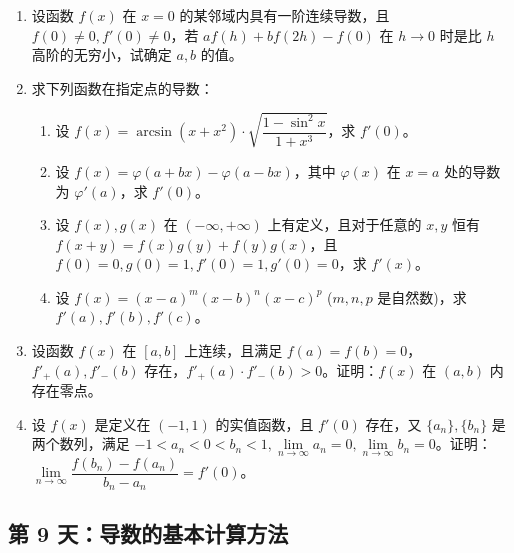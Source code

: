 \begin{enumerate}[label=\textbf{\arabic*.}, itemsep=4.7cm]
    \item 设函数 $f(x)$ 在 $x=0$ 的某邻域内具有一阶连续导数，且 $f(0) \neq 0, f'(0) \neq 0$，若 $a f(h) + b f(2h) - f(0)$ 在 $h \to 0$ 时是比 $h$ 高阶的无穷小，试确定 $a, b$ 的值。

    \item 求下列函数在指定点的导数：
    \begin{enumerate}[label=(\arabic*),itemsep=3cm]
        \item 设 $f(x) = \arcsin(x + x^2) \cdot \sqrt{\dfrac{1 - \sin^2 x}{1 + x^3}}$，求 $f'(0)$。
        \item 设 $f(x) = \varphi(a + bx) - \varphi(a - bx)$，其中 $\varphi(x)$ 在 $x=a$ 处的导数为 $\varphi'(a)$，求 $f'(0)$。
        \item 设 $f(x), g(x)$ 在 $(-\infty, +\infty)$ 上有定义，且对于任意的 $x, y$ 恒有 $f(x+y) = f(x)g(y) + f(y)g(x)$，且 $f(0)=0, g(0)=1, f'(0)=1, g'(0)=0$，求 $f'(x)$。
        \item 设 $f(x) = (x-a)^m(x-b)^n(x-c)^p$ ($m, n, p$ 是自然数)，求 $f'(a), f'(b), f'(c)$。
    \end{enumerate}

    \item 设函数 $f(x)$ 在 $[a, b]$ 上连续，且满足 $f(a) = f(b) = 0$，$f'_+(a), f'_-(b)$ 存在，$f'_+(a) \cdot f'_-(b) > 0$。证明：$f(x)$ 在 $(a, b)$ 内存在零点。

    \item 设 $f(x)$ 是定义在 $(-1, 1)$ 的实值函数，且 $f'(0)$ 存在，又 $\{a_n\}, \{b_n\}$ 是两个数列，满足 $-1 < a_n < 0 < b_n < 1, \lim\limits_{n \to \infty} a_n = 0, \lim\limits_{n \to \infty} b_n = 0$。证明：$\lim\limits_{n \to \infty} \dfrac{f(b_n) - f(a_n)}{b_n - a_n} = f'(0)$。
\end{enumerate}

\newpage
\subsection*{第 9 天：导数的基本计算方法}


